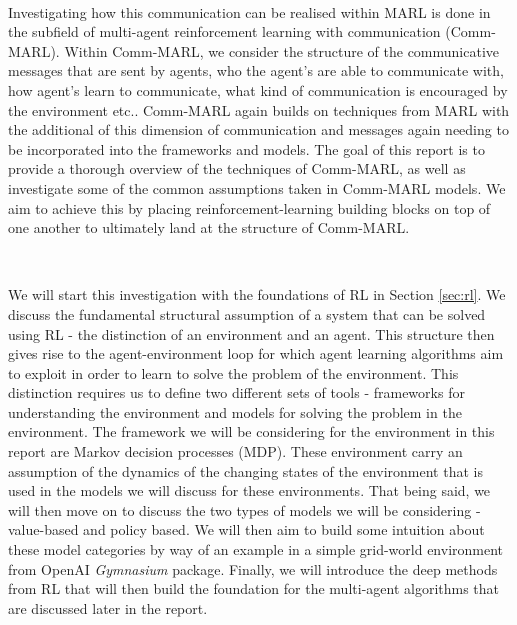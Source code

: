 \documentclass{article}
\begin{document}
\

Investigating how this communication can be realised within MARL is done in the subfield of multi-agent reinforcement learning with communication (Comm-MARL). Within Comm-MARL, we consider the structure of the communicative messages that are sent by agents, who the agent's are able to communicate with, how agent's learn to communicate, what kind of communication is encouraged by the environment etc.. Comm-MARL again builds on techniques from MARL with the additional of this dimension of communication and messages again needing to be incorporated into the frameworks and models. The goal of this report is to provide a thorough overview of the techniques of Comm-MARL, as well as investigate some of the common assumptions taken in Comm-MARL models. We aim to achieve this by placing reinforcement-learning building blocks on top of one another to ultimately land at the structure of Comm-MARL.

\

We will start this investigation with the foundations of RL in Section \ref{sec:rl}. We discuss the fundamental structural assumption of a system that can be solved using RL - the distinction of an environment and an agent. This structure then gives rise to the agent-environment loop for which agent learning algorithms aim to exploit in order to learn to solve the problem of the environment.  This distinction requires us to define two different sets of tools - frameworks for understanding the environment and models for solving the problem in the environment. The framework we will be considering for the environment in this report are Markov decision processes (MDP). These environment carry an assumption of the dynamics of the changing states of the environment that is used in the models we will discuss for these environments. That being said, we will then move on to discuss the two types of models we will be considering - value-based and policy based. We will then aim to build some intuition about these model categories by way of an example in a simple grid-world environment from OpenAI \textit{Gymnasium} \citep{kwiatkowski2024gymnasium} package. Finally, we will introduce the deep methods from RL that will then build the foundation for the multi-agent algorithms that are discussed later in the report.

\

\end{document}
